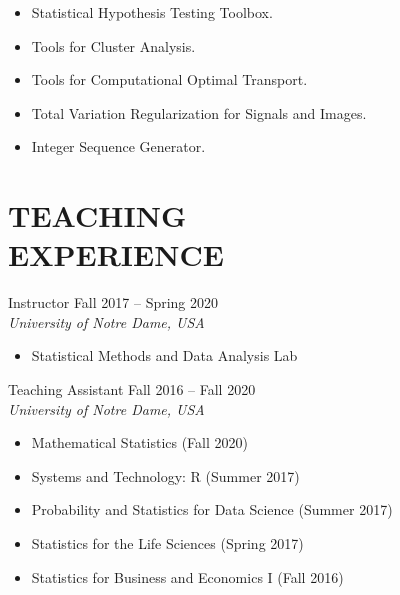 \documentclass[margin, 10pt]{res} %
\begin{document}
\begin{resume}
\begin{itemize}
    \item{  Statistical Hypothesis Testing Toolbox.}
    \item{  Tools for Cluster Analysis.}
    \item{  Tools for Computational Optimal Transport.}
    \item{ Total Variation Regularization for Signals and Images.}
    \item{  Integer Sequence Generator.}
\end{itemize}
\vspace{.2cm}



 
\section{\sf TEACHING\\ EXPERIENCE}

Instructor \hfill Fall 2017 -- Spring 2020 \\
{\sl University of Notre Dame, USA}
\begin{itemize} \itemsep -2pt
	\item Statistical Methods and Data Analysis Lab
\end{itemize}

Teaching Assistant \hfill Fall 2016 -- Fall 2020 \\
{\sl University of Notre Dame, USA}
\begin{itemize} \itemsep -2pt
	\item Mathematical Statistics (Fall 2020)
	\item Systems and Technology: R (Summer 2017)
	\item Probability and Statistics for Data Science (Summer 2017)
	\item Statistics for the Life Sciences (Spring 2017)
	\item Statistics for Business and Economics I (Fall 2016)
\end{itemize}


\end{resume}
\end{document}
